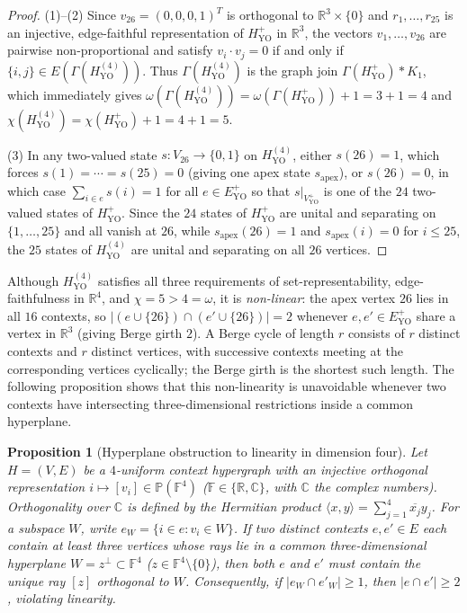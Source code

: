 \documentclass[
  aps,
  pra,
  reprint,
  superscriptaddress,
  amsmath,
  amssymb,
  nofootinbib,
  floatfix
]{revtex4-2}
\newtheorem{proposition}[theorem]{Proposition}
\theoremstyle{definition}
\theoremstyle{remark}
\newcommand{\R}{\mathbb{R}}
\newcommand{\C}{\mathbb{C}}
\newcommand{\F}{\mathbb{F}}
\newcommand{\PP}{\mathbb{P}}
\newcommand{\YO}{\mathrm{YO}}
\begin{document}
\begin{proof}
(1)--(2) Since $v_{26}=(0,0,0,1)^T$ is orthogonal to $\R^3\times\{0\}$ and $r_1,\ldots,r_{25}$ is an injective, edge-faithful representation of $H_{\YO}^{+}$ in $\R^3$, the vectors $v_1,\ldots,v_{26}$ are pairwise non-proportional and satisfy $v_i\cdot v_j=0$ if and only if $\{i,j\}\in E(\Gamma(H_{\YO}^{(4)}))$. Thus $\Gamma(H_{\YO}^{(4)})$ is the graph join $\Gamma(H_{\YO}^{+})*K_1$, which immediately gives $\omega(\Gamma(H_{\YO}^{(4)}))=\omega(\Gamma(H_{\YO}^{+}))+1=3+1=4$ and $\chi(H_{\YO}^{(4)})=\chi(H_{\YO}^{+})+1=4+1=5$.

(3) In any two-valued state $s:V_{26}\to\{0,1\}$ on $H_{\YO}^{(4)}$, either $s(26)=1$, which forces $s(1)=\cdots=s(25)=0$ (giving one apex state $s_{\mathrm{apex}}$), or $s(26)=0$, in which case $\sum_{i\in e}s(i)=1$ for all $e\in E_{\YO}^{+}$ so that $s|_{V_{\YO}^{+}}$ is one of the $24$ two-valued states of $H_{\YO}^{+}$. Since the $24$ states of $H_{\YO}^{+}$ are unital and separating on $\{1,\ldots,25\}$ and all vanish at $26$, while $s_{\mathrm{apex}}(26)=1$ and $s_{\mathrm{apex}}(i)=0$ for $i\le 25$, the $25$ states of $H_{\YO}^{(4)}$ are unital and separating on all $26$ vertices.
\end{proof}

Although $H_{\YO}^{(4)}$ satisfies all three requirements of set-representability, edge-faithfulness in $\R^4$, and $\chi=5>4=\omega$, it is \emph{non-linear}: the apex vertex $26$ lies in all $16$ contexts, so $|(e\cup\{26\})\cap(e'\cup\{26\})|=2$ whenever $e,e'\in E_{\YO}^{+}$ share a vertex in $\R^3$ (giving Berge girth $2$). A Berge cycle of length $r$ consists of $r$ distinct contexts and $r$ distinct vertices, with successive contexts meeting at the corresponding vertices cyclically; the Berge girth is the shortest such length. The following proposition shows that this non-linearity is unavoidable whenever two contexts have intersecting three-dimensional restrictions inside a common hyperplane.

\begin{proposition}[Hyperplane obstruction to linearity in dimension four]\label{prop:hyperplane-obstruction}
Let $H=(V,E)$ be a $4$-uniform context hypergraph with an injective orthogonal representation $i\mapsto[v_i]\in\PP(\F^4)$ ($\F\in\{\R,\C\}$, with $\C$ the complex numbers). Orthogonality over $\C$ is defined by the Hermitian product $\langle x,y\rangle=\sum_{j=1}^4\overline{x_j}y_j$. For a subspace $W$, write $e_W=\{i\in e:v_i\in W\}$. If two distinct contexts $e,e'\in E$ each contain at least three vertices whose rays lie in a common three-dimensional hyperplane $W=z^\perp\subset\F^4$ ($z\in\F^4\setminus\{0\}$), then both $e$ and $e'$ must contain the unique ray $[z]$ orthogonal to $W$. Consequently, if $|e_W\cap e'_W|\ge1$, then $|e\cap e'|\ge2$, violating linearity.
\end{proposition}
\end{document}
